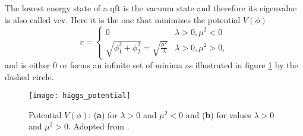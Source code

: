 The lowest energy state of a \ac{qft} is the vacuum state and therefore its eigenvalue is also called \ac{vev}. Here it is the one that minimizes the potential $V(\phi)$
\begin{equation}
    v =
    \begin{cases}
        0                                                     & \lambda>0, \mu^2<0  \\
        \sqrt{\phi_1^2+\phi_2^2}=\sqrt{\frac{\mu^2}{\lambda}} & \lambda>0, \mu^2>0,
    \end{cases}
\end{equation}
and is either 0 or forms an infinite set of minima as illustrated in figure \ref{fig:higgs_potential} by the dashed circle.
\begin{figure}
    \centering
    \texttt{[image: higgs\_potential]}
    \caption[]{Potential $V(\phi)$: (\textbf{a}) for $\lambda>0$ and $\mu^2<0$ and (\textbf{b}) for values $\lambda>0$ and $\mu^2>0$. Adopted from \citep{thomson2013modern}.}
    \label{fig:higgs_potential}
\end{figure}

